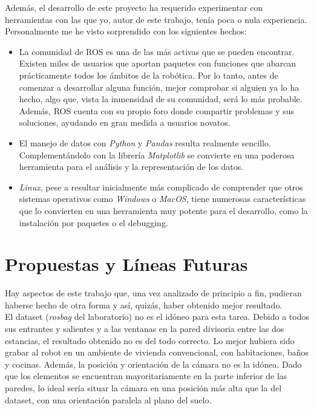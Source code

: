 Además, el desarrollo de este proyecto ha requerido experimentar con herramientas con las que yo, autor de este trabajo, tenía poca o nula experiencia. Personalmente me he visto sorprendido con los siguientes hechos:

\begin{itemize}
	\item La comunidad de ROS es una de las más activas que se pueden encontrar. Existen miles de usuarios que aportan paquetes con funciones que abarcan prácticamente todos los ámbitos de la robótica. Por lo tanto, antes de comenzar a desarrollar alguna función, mejor comprobar si alguien ya lo ha hecho, algo que, vista la inmensidad de su comunidad, será lo más probable. Además, ROS cuenta con su propio foro donde compartir problemas y sus soluciones, ayudando en gran medida a usuarios novatos.
	\item El manejo de datos con \textit{Python} y \textit{Pandas}
 resulta realmente sencillo. Complementándolo con la librería \textit{Matplotlib} se convierte en una poderosa herramienta para el análisis y la representación de los datos.
 	\item \textit{Linux}, pese a resultar inicialmente más complicado de comprender que otros sistemas operativos como \textit{Windows} o \textit{MacOS}, tiene numerosas características que lo convierten en una herramienta muy potente para el desarrollo, como la instalación por paquetes o el debugging.
\end{itemize}

\section{Propuestas y Líneas Futuras}

Hay aspectos de este trabajo que, una vez analizado de principio a fin, pudieran haberse hecho de otra forma y así, quizás, haber obtenido mejor resultado.\\

El dataset (\textit{rosbag} del laboratorio) no es el idóneo para esta tarea. Debido a todos sus entrantes y salientes y a las ventanas en la pared divisoria entre las dos estancias, el resultado obtenido no es del todo correcto. Lo mejor hubiera sido grabar al robot en un ambiente de vivienda convencional, con habitaciones, baños y cocinas. Además, la posición y orientación de la cámara no es la idónea. Dado que los elementos se encuentran mayoritariamente en la parte inferior de las paredes, lo ideal sería situar la cámara en una posición más alta que la del dataset, con una orientación paralela al plano del suelo.\\


